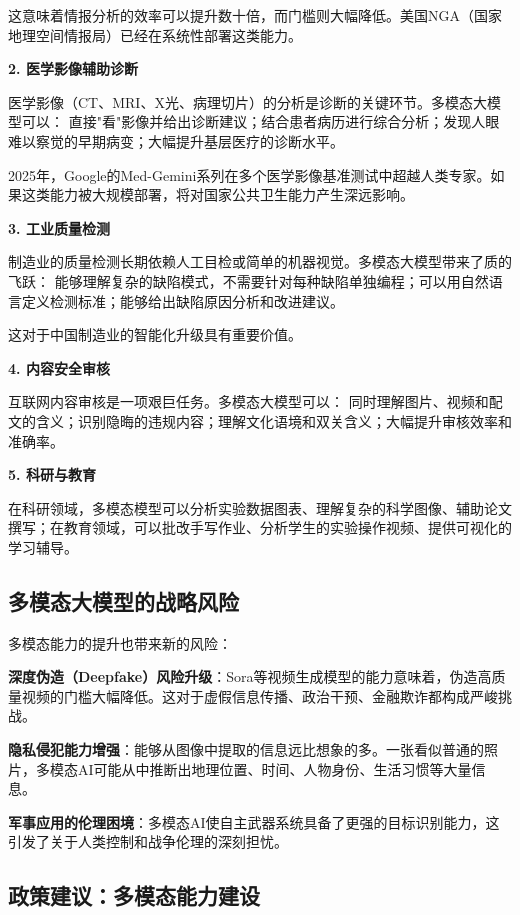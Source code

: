 这意味着情报分析的效率可以提升数十倍，而门槛则大幅降低。美国NGA（国家地理空间情报局）已经在系统性部署这类能力。

\textbf{2. 医学影像辅助诊断}

医学影像（CT、MRI、X光、病理切片）的分析是诊断的关键环节。多模态大模型可以：
直接"看"影像并给出诊断建议；结合患者病历进行综合分析；发现人眼难以察觉的早期病变；大幅提升基层医疗的诊断水平。

2025年，Google的Med-Gemini系列在多个医学影像基准测试中超越人类专家。如果这类能力被大规模部署，将对国家公共卫生能力产生深远影响。

\textbf{3. 工业质量检测}

制造业的质量检测长期依赖人工目检或简单的机器视觉。多模态大模型带来了质的飞跃：
能够理解复杂的缺陷模式，不需要针对每种缺陷单独编程；可以用自然语言定义检测标准；能够给出缺陷原因分析和改进建议。

这对于中国制造业的智能化升级具有重要价值。

\textbf{4. 内容安全审核}

互联网内容审核是一项艰巨任务。多模态大模型可以：
同时理解图片、视频和配文的含义；识别隐晦的违规内容；理解文化语境和双关含义；大幅提升审核效率和准确率。

\textbf{5. 科研与教育}

在科研领域，多模态模型可以分析实验数据图表、理解复杂的科学图像、辅助论文撰写；在教育领域，可以批改手写作业、分析学生的实验操作视频、提供可视化的学习辅导。

\subsection{多模态大模型的战略风险}

多模态能力的提升也带来新的风险：

\textbf{深度伪造（Deepfake）风险升级}：Sora等视频生成模型的能力意味着，伪造高质量视频的门槛大幅降低。这对于虚假信息传播、政治干预、金融欺诈都构成严峻挑战。

\textbf{隐私侵犯能力增强}：能够从图像中提取的信息远比想象的多。一张看似普通的照片，多模态AI可能从中推断出地理位置、时间、人物身份、生活习惯等大量信息。

\textbf{军事应用的伦理困境}：多模态AI使自主武器系统具备了更强的目标识别能力，这引发了关于人类控制和战争伦理的深刻担忧。

\subsection{政策建议：多模态能力建设}

